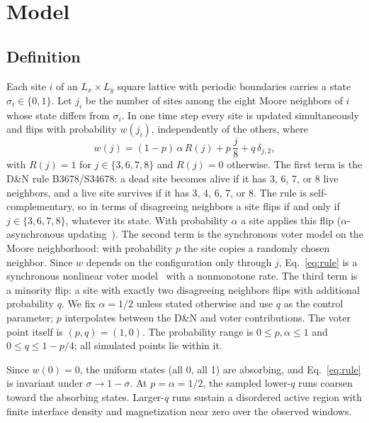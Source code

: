 \section{Model}
\label{sec:model}

\subsection{Definition}

Each site $i$ of an $L_x\times L_y$ square lattice with periodic boundaries carries a state
$\sigma_i\in\{0,1\}$. Let $j_i$ be the number of sites among the eight Moore neighbors of $i$
whose state differs from $\sigma_i$. In one time step every site is updated simultaneously and
flips with probability $w(j_i)$, independently of the others, where
\begin{equation}
w(j) = (1-p)\,\alpha\,R(j) + p\,\frac{j}{8} + q\,\delta_{j,2},
\label{eq:rule}
\end{equation}
with $R(j) = 1$ for $j\in\{3,6,7,8\}$ and $R(j) = 0$ otherwise. The first term is the D\&N rule
B3678/S34678: a dead site becomes alive if it has 3, 6, 7, or 8
live neighbors, and a live site survives if it has 3, 4, 6, 7, or 8. The rule is
self-complementary, so in terms of disagreeing neighbors a site flips if and only if
$j\in\{3,6,7,8\}$, whatever its state. With probability $\alpha$ a site applies this flip
($\alpha$-asynchronous updating~\cite{fates2005,blok1999}). The second term is the synchronous
voter model on the Moore neighborhood: with probability $p$ the site copies a randomly chosen
neighbor. Since $w$ depends on the configuration only through $j$, Eq.~\eqref{eq:rule} is a
synchronous nonlinear voter model~\cite{cox1991,molofsky1999,schweitzer2009} with a nonmonotone
rate. The third term is a minority flip: a site with exactly two disagreeing neighbors flips
with additional probability $q$. We fix $\alpha = 1/2$ unless stated otherwise and use $q$ as the
control parameter; $p$ interpolates between the D\&N and voter contributions.
The voter point itself is $(p,q)=(1,0)$.
The probability range is $0\le p,\alpha\le1$ and $0\le q\le1-p/4$;
all simulated points lie within it.

Since $w(0) = 0$, the uniform states (all 0, all 1) are absorbing, and Eq.~\eqref{eq:rule} is
invariant under $\sigma\to 1-\sigma$. At $p=\alpha=1/2$, the sampled lower-$q$ runs coarsen toward the
absorbing states. Larger-$q$ runs sustain a disordered active region with
finite interface density and magnetization near zero over the observed windows.

